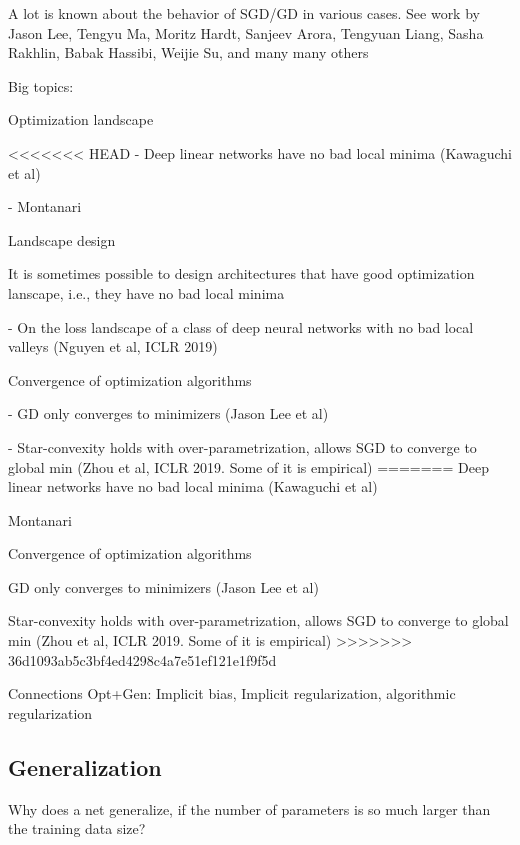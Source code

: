\documentclass[english]{article}
\begin{document}
\item A lot is known about the behavior of SGD/GD in various cases. See work by Jason Lee, Tengyu Ma, Moritz Hardt, Sanjeev Arora, Tengyuan Liang, Sasha Rakhlin, Babak Hassibi, Weijie Su, and many many others

Big topics: 

\benum 
\item 
Optimization landscape

<<<<<<< HEAD
- Deep linear networks have no bad local minima (Kawaguchi et al)

- Montanari

\item Landscape design

It is sometimes possible to design architectures that have good optimization lanscape, i.e., they have no bad local minima

- On the loss landscape of a class of deep neural networks with no bad local valleys (Nguyen et al, ICLR 2019)


\item Convergence of optimization algorithms

- GD only converges to minimizers (Jason Lee et al)

- Star-convexity holds with over-parametrization, allows SGD to converge to global min (Zhou et al, ICLR 2019. Some of it is empirical) 
=======
Deep linear networks have no bad local minima (Kawaguchi et al)

Montanari

\item Convergence of optimization algorithms

GD only converges to minimizers (Jason Lee et al)

Star-convexity holds with over-parametrization, allows SGD to converge to global min (Zhou et al, ICLR 2019. Some of it is empirical) 
>>>>>>> 36d1093ab5c3bf4ed4298c4a7e51ef121e1f9f5d


\item Connections Opt+Gen: Implicit bias, Implicit regularization, algorithmic regularization 

\eenum 

\eenum


\subsection{Generalization}


\benum
\item Why does a net generalize, if the number of parameters is so much larger than the training data size?
\end{document}
